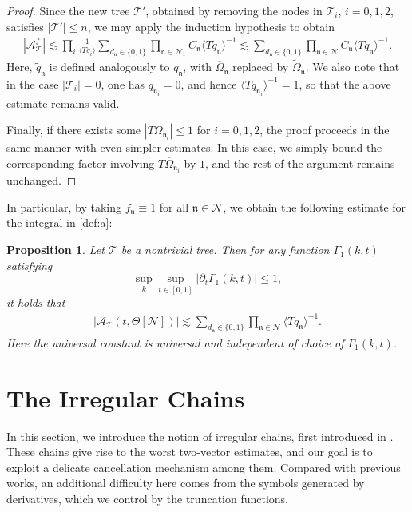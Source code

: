 \documentclass[UTF-8,reqno]{amsart}
\numberwithin{equation}{section}
\newtheorem{proposition}[theorem]{Proposition}
\theoremstyle{definition}
\def\leq{\leqslant}
\def\leq{\leqslant}
\begin{document}
\begin{proof}
  Since the new tree $\mathcal{T}'$, obtained by removing the nodes in $\mathcal{T}_i$, $i=0,1,2$, satisfies $|\mathcal{T}'|\leq n$, we may apply the induction hypothesis to obtain
\begin{align*}
    |\mathcal{A}^f_{\mathcal{T}}|\lesssim\prod_{i} \frac{1}{\langle Tq_i\rangle}\sum_{d_\mathfrak{n}\in\{0,1\}}\prod_{\mathfrak{n}\in\mathcal{N}_1}C_\mathfrak{n}\langle T\tilde q_\mathfrak{n}\rangle^{-1}\lesssim \sum_{d_\mathfrak{n}\in\{0,1\}}\prod_{\mathfrak{n}\in\mathcal{N}}C_\mathfrak{n}\langle Tq_\mathfrak{n}\rangle^{-1}.
\end{align*}
Here, $\tilde q_\mathfrak{n}$ is defined analogously to $q_\mathfrak{n}$, with $\overline{\Omega}_{\mathfrak{n}}$ replaced by $\tilde{\Omega}_{\mathfrak{n}}$.
We also note that in the case $|\mathcal{T}_i|=0$, one has $q_{\mathfrak{n}_i}=0$, and hence $\langle Tq_{\mathfrak{n}_i}\rangle^{-1}=1$, so that the above estimate remains valid.
 
Finally, if there exists some $ |T\overline{\Omega}_{\mathfrak{n}_i}| \leq 1 $ for $ i = 0,1,2 $,
the proof proceeds in the same manner with even simpler estimates.
In this case, we simply bound the corresponding factor involving $T\overline{\Omega}_{\mathfrak{n}_i}$ by $1$, and the rest of the argument remains unchanged.
\end{proof}

In particular, by taking $f_{\mathfrak{n}}\equiv 1$ for all $\mathfrak{n}\in\mathcal{N}$, we obtain the following estimate for the integral in \eqref{def:a}:
\begin{proposition}\label{prop:est:a}
Let $\mathcal{T}$ be a nontrivial tree. 
Then for any function $\Gamma_1(k,t)$ satisfying $$\sup_k\sup_{t\in[0,1]}|\partial_t\Gamma_1(k,t)|\leq 1,$$
it holds that
\begin{align*}
  |\mathcal{A}_{\mathcal{T}}(t,\Theta[\mathcal{N}])|\lesssim \sum_{d_\mathfrak{n}\in\{0,1\}}\prod_{\mathfrak{n}\in\mathcal{N}}\langle Tq_\mathfrak{n}\rangle^{-1}.
\end{align*}
Here the universal constant is universal and independent of choice of $\Gamma_1(k,t)$.
\end{proposition} 



\section{The Irregular Chains}\label{sec:irregular}
In this section, we introduce the notion of irregular chains, first introduced in \cite{DH23a}.
These chains give rise to the worst two-vector estimates, and our goal is to exploit a delicate cancellation mechanism among them.
Compared with previous works, an additional difficulty here comes from the symbols generated by derivatives, which we control by the
truncation functions.
\end{document}

